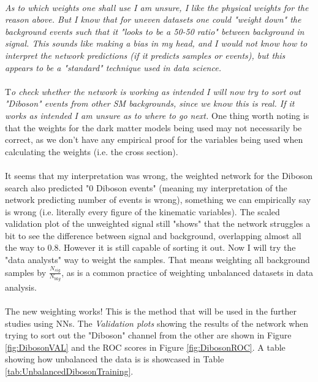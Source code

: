 \documentclass[14pt, a4paper]{book}
\begin{document}
\\\textit{As to which weights one shall use I am unsure, I like the physical weights for the reason above. But I know that for uneven datasets one could "weight down" the background events such that it "looks to be a 50-50 ratio" between background in signal. This sounds like making a bias in my head, and I would not know how to interpret the network predictions (if it predicts samples or events), but this appears to be a "standard" technique used in data science.}\\
\\T\textit{o check whether the network is working as intended I will now try to sort out "Diboson" events from other SM backgrounds, since we know this is real. If it works as intended I am unsure as to where to go next.} One thing worth noting is that the weights for the dark matter models being used may not necessarily be correct, as we don't have any empirical proof for the variables being used when calculating the weights (i.e. the cross section). \\
\\It seems that my interpretation was wrong, the weighted network for the Diboson search also predicted "0 Diboson events" (meaning my interpretation of the network predicting number of events is wrong), something we can empirically say is wrong (i.e. literally every figure of the kinematic variables). The scaled validation plot of the unweighted signal still "shows" that the network struggles a bit to see the difference between signal and background, overlapping almost all the way to 0.8. However it is still capable of sorting it out. Now I will try the "data analysts" way to weight the samples. That means weighting all background samples by $\frac{N_{sig}}{N_{bkg}}$, as is a common practice of weighting unbalanced datasets in data analysis.\\
\\The new weighting works! This is the method that will be used in the further studies using NNs. The \textit{Validation plots} showing the results of the network when trying to sort out the "Diboson" channel from the other are shown in Figure \ref{fig:DibosonVAL} and the ROC scores in Figure \ref{fig:DibosonROC}. A table showing how unbalanced the data is is showcased in Table \ref{tab:UnbalancedDibosonTraining}.\\
\end{document}
